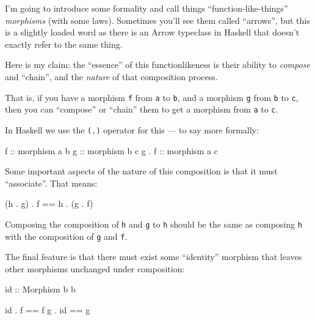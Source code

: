 \documentclass[]{article}
\newenvironment{Shaded}{}{}
\newcommand{\DataTypeTok}[1]{\textcolor[rgb]{0.56,0.13,0.00}{#1}}
\newcommand{\FunctionTok}[1]{\textcolor[rgb]{0.02,0.16,0.49}{#1}}
\newcommand{\NormalTok}[1]{#1}
\newcommand{\OperatorTok}[1]{\textcolor[rgb]{0.40,0.40,0.40}{#1}}
\newcommand{\OtherTok}[1]{\textcolor[rgb]{0.00,0.44,0.13}{#1}}
\begin{document}
I'm going to introduce some formality and call things ``function-like-things''
\emph{morphisms} (with some laws). Sometimes you'll see them called ``arrows'',
but this is a slightly loaded word as there is an Arrow typeclass in Haskell
that doesn't exactly refer to the same thing.

Here is my claim: the ``essence'' of this functionlikeness is their ability to
\emph{compose} and ``chain'', and the \emph{nature} of that composition process.

That is, if you have a morphism \texttt{f} from \texttt{a} to \texttt{b}, and a
morphism \texttt{g} from \texttt{b} to \texttt{c}, then you can ``compose'' or
``chain'' them to get a morphism from \texttt{a} to \texttt{c}.

In Haskell we use the \texttt{(.)} operator for this --- to say more formally:

\begin{Shaded}
\begin{Highlighting}[]
\OtherTok{f     ::}\NormalTok{ morphism a b}
\OtherTok{g     ::}\NormalTok{ morphism b c}
\NormalTok{g }\OperatorTok{.}\OtherTok{ f ::}\NormalTok{ morphism a c}
\end{Highlighting}
\end{Shaded}

Some important aspects of the nature of this composition is that it must
``associate''. That means:

\begin{Shaded}
\begin{Highlighting}[]
\NormalTok{(h }\OperatorTok{.}\NormalTok{ g) }\OperatorTok{.}\NormalTok{ f }\OperatorTok{==}\NormalTok{ h }\OperatorTok{.}\NormalTok{ (g }\OperatorTok{.}\NormalTok{ f)}
\end{Highlighting}
\end{Shaded}

Composing the composition of \texttt{h} and \texttt{g} to \texttt{h} should be
the same as composing \texttt{h} with the composition of \texttt{g} and
\texttt{f}.

The final feature is that there must exist some ``identity'' morphism that
leaves other morphisms unchanged under composition:

\begin{Shaded}
\begin{Highlighting}[]
\FunctionTok{id}\OtherTok{ ::} \DataTypeTok{Morphism}\NormalTok{ b b}

\FunctionTok{id} \OperatorTok{.}\NormalTok{ f  }\OperatorTok{==}\NormalTok{ f}
\NormalTok{g  }\OperatorTok{.} \FunctionTok{id} \OperatorTok{==}\NormalTok{ g}
\end{Highlighting}
\end{Shaded}
\end{document}
